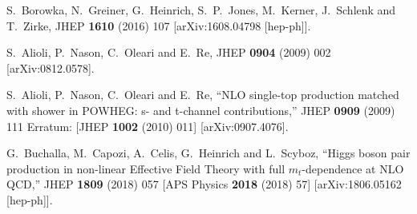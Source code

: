 \documentclass[paper]{JHEP3}
\begin{document}
\begin{thebibliography}{10}
  S.~Borowka, N.~Greiner, G.~Heinrich, S.~P.~Jones, M.~Kerner, J.~Schlenk and T.~Zirke,
  JHEP {\bf 1610} (2016) 107
  [arXiv:1608.04798 [hep-ph]].

  S.~Alioli, P.~Nason, C.~Oleari and E.~Re,
  JHEP {\bf 0904} (2009) 002
  [arXiv:0812.0578].

  S.~Alioli, P.~Nason, C.~Oleari and E.~Re,
  ``NLO single-top production matched with shower in POWHEG: s- and t-channel contributions,''
  JHEP {\bf 0909} (2009) 111
   Erratum: [JHEP {\bf 1002} (2010) 011]
  [arXiv:0907.4076].
  
  G.~Buchalla, M.~Capozi, A.~Celis, G.~Heinrich and L.~Scyboz,
  ``Higgs boson pair production in non-linear Effective Field Theory with full $m_t$-dependence at NLO QCD,''
  JHEP {\bf 1809} (2018) 057
   [APS Physics {\bf 2018} (2018) 57]
  [arXiv:1806.05162 [hep-ph]].
  
\end{thebibliography}
\end{document}
